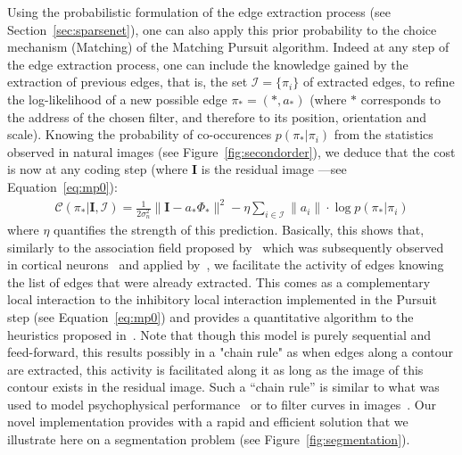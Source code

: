 \documentclass[a4paper, 11pt]{book}
\newcommand{\image}{\mathbf{I}} %
\begin{document}
Using the probabilistic formulation of the edge extraction process (see Section~\ref{sec:sparsenet}), one can also apply this prior probability to the choice mechanism (Matching) of the Matching Pursuit algorithm.
Indeed at any step of the edge extraction process, one can include the knowledge gained by the extraction of previous edges, that is, the set  $\mathcal{I} =\{\pi_i\}$ of extracted edges, to refine the log-likelihood of a new possible edge $\pi_\ast=(\ast, a_\ast)$ (where $\ast$ corresponds to the address of the chosen filter, and therefore to its position, orientation and scale).
Knowing the probability of co-occurences $p ( \pi_\ast | \pi_i)$ from the statistics observed in natural images (see Figure~\ref{fig:secondorder}), we deduce that the cost is now at any coding step (where $\image$ is the residual image ---see Equation~\ref{eq:mp0}):
\begin{eqnarray}%
\mathcal{C}(\pi_\ast | \image, \mathcal{I}) = \frac{1}{2\sigma_n^2} \| \image - a_\ast \Phi_\ast \|^2  - \eta \sum_{i\in \mathcal{I}} \| a_i \| \cdot \log p ( \pi_\ast | \pi_i)%
\label{eq:efficiency_cooc}%
\end{eqnarray}%
where $\eta$ quantifies the strength of this prediction.
Basically, this shows that, similarly to the association field proposed by~\citep{Grossberg84} which was subsequently observed in cortical neurons~\citep{vonderHeydt84} and applied by~\citep{Field93},
we facilitate the activity of edges knowing the list of edges that were already extracted.
This comes as a complementary local interaction to the inhibitory local interaction implemented in the Pursuit step (see Equation~\ref{eq:mp0})
and provides a quantitative algorithm to the heuristics proposed in~\citep{Fischer07}.
Note that though this model is purely sequential and feed-forward, this results possibly in a "chain rule" as when edges along a contour are extracted,
this activity is facilitated along it as long as the image of this contour exists in the residual image.
Such a ``chain rule'' is similar to what was used to model psychophysical performance~\citep{Geisler01} or to filter curves in images~\citep{August01}.
Our novel implementation provides with a rapid and efficient solution that we illustrate here on a segmentation problem (see Figure~\ref{fig:segmentation}).
\end{document}
